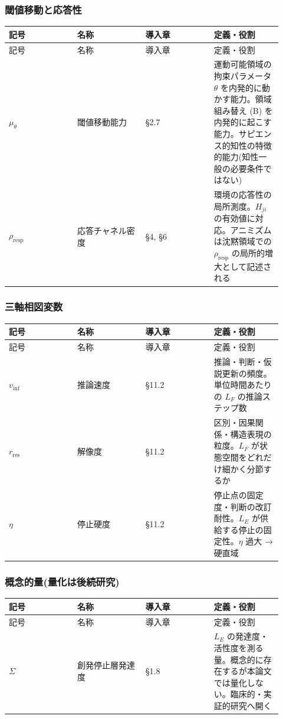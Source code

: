 \subsubsection{閾値移動と応答性}


\begin{longtable}{@{}p{0.23\linewidth}p{0.23\linewidth}p{0.23\linewidth}p{0.23\linewidth}@{}}
\toprule
記号 & 名称 & 導入章 & 定義・役割 \\
\midrule
\endfirsthead
\toprule
記号 & 名称 & 導入章 & 定義・役割 \\
\midrule
\endhead
$\mu_\theta$ & 閾値移動能力 & \S{}2.7 & 運動可能領域の拘束パラメータ $\theta$ を内発的に動かす能力。領域組み替え (B) を内発的に起こす能力。サピエンス的知性の特徴的能力(知性一般の必要条件ではない) \\
$\rho_{\text{resp}}$ & 応答チャネル密度 & \S{}4, \S{}6 & 環境の応答性の局所測度。$H_{ji}$ の有効値に対応。アニミズムは沈黙領域での $\rho_{\text{resp}}$ の局所的増大として記述される \\
\bottomrule
\end{longtable}


\subsubsection{三軸相図変数}


\begin{longtable}{@{}p{0.23\linewidth}p{0.23\linewidth}p{0.23\linewidth}p{0.23\linewidth}@{}}
\toprule
記号 & 名称 & 導入章 & 定義・役割 \\
\midrule
\endfirsthead
\toprule
記号 & 名称 & 導入章 & 定義・役割 \\
\midrule
\endhead
$v_{\text{inf}}$ & 推論速度 & \S{}11.2 & 推論・判断・仮説更新の頻度。単位時間あたりの $L_F$ の推論ステップ数 \\
$r_{\text{res}}$ & 解像度 & \S{}11.2 & 区別・因果関係・構造表現の粒度。$L_F$ が状態空間をどれだけ細かく分節するか \\
$\eta$ & 停止硬度 & \S{}11.2 & 停止点の固定度・判断の改訂耐性。$L_E$ が供給する停止の固定性。$\eta$ 過大 → 硬直域 \\
\bottomrule
\end{longtable}


\subsubsection{概念的量(量化は後続研究)}


\begin{longtable}{@{}p{0.23\linewidth}p{0.23\linewidth}p{0.23\linewidth}p{0.23\linewidth}@{}}
\toprule
記号 & 名称 & 導入章 & 定義・役割 \\
\midrule
\endfirsthead
\toprule
記号 & 名称 & 導入章 & 定義・役割 \\
\midrule
\endhead
$\Sigma$ & 創発停止層発達度 & \S{}1.8 & $L_E$ の発達度・活性度を測る量。概念的に存在するが本論文では量化しない。臨床的・実証的研究へ開く \\
\bottomrule
\end{longtable}


